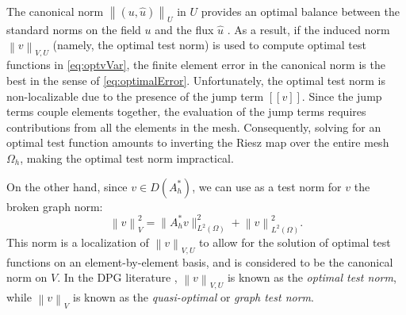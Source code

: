 \documentclass[11pt,onecolumn]{scrartcl}
\newcommand{\eqnref}[1]{\eqref{eq:#1}}
\newcommand{\secref}[1]{\ref{sec:#1}}
\newcommand{\nor}[1]{\left\| #1 \right\|}
\newcommand{\LRp}[1]{\left( #1 \right)}
\newcommand{\LRs}[1]{\left[ #1 \right]}
\newcommand{\LRa}[1]{\left\langle #1 \right\rangle}
\newcommand{\jump}[1] {\ensuremath{\LRs{\![#1]\!}}}
\newcommand{\uh}{\widehat{u}}
\renewcommand{\L}{L^2\LRp{\Omega}}
\newcommand{\Gh}{\Gamma_h}
\newcommand{\Oh}{\Omega_h}
\begin{document}
The canonical norm $\nor{\LRp{u,\uh}}_U$ in $U$ provides an optimal balance between the standard norms on the field $u$ and the flux $\uh$ \cite{DPG4}. As a result, if the induced norm $\nor{v}_{V,U}$ (namely, the optimal test norm) is used to compute  optimal test functions in \eqnref{optvVar}, the finite element error in the canonical norm is the best in the sense of \eqnref{optimalError}. Unfortunately, the optimal test norm is non-localizable due to the presence of the jump term $\jump{v}$. Since the jump terms couple elements together, the evaluation of the jump terms requires contributions from all the elements in the mesh. Consequently, solving for an optimal test function amounts to inverting the Riesz map over the entire mesh $\Oh$, making the optimal test norm impractical.

On the other hand, since $v \in D\LRp{A^*_h}$, we can use as a test norm for $v$ the broken graph norm: 
\[
\nor{v}_V^2 =  \|A_h^*v\|_{\L}^2 + \nor{v}_{\L}^2.
\]
This norm is a localization of $\nor{v}_{V,U}$ to allow for the solution of optimal test functions on an element-by-element basis, and is considered to be the canonical norm on $V$.  In the DPG literature \cite{DPG4}, $\nor{v}_{V,U}$ is known as the {\em optimal test norm}, while $\nor{v}_{V}$ is known as the {\em quasi-optimal} or {\em graph test norm}.


\end{document}
